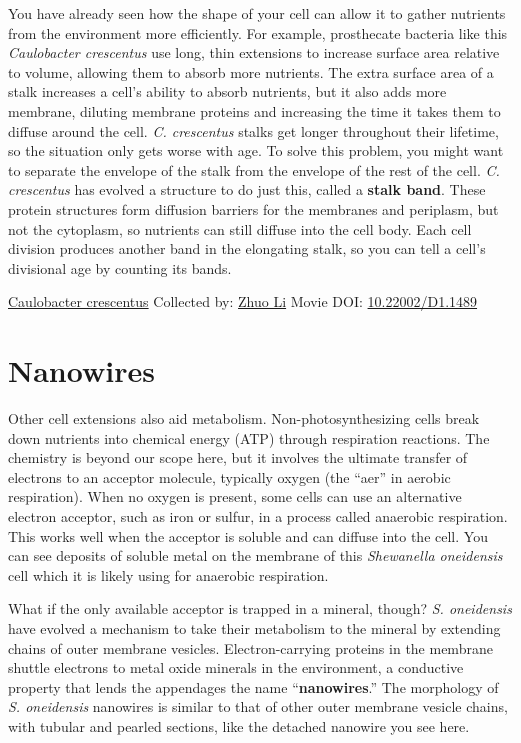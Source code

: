 \documentclass[]{tufte-book}
\begin{document}
You have already seen how the shape of your cell can allow it to gather nutrients from the environment more efficiently. For example, prosthecate bacteria like this \emph{Caulobacter crescentus} use long, thin extensions to increase surface area relative to volume, allowing them to absorb more nutrients. The extra surface area of a stalk increases a cell's ability to absorb nutrients, but it also adds more membrane, diluting membrane proteins and increasing the time it takes them to diffuse around the cell. \emph{C. crescentus} stalks get longer throughout their lifetime, so the situation only gets worse with age. To solve this problem, you might want to separate the envelope of the stalk from the envelope of the rest of the cell. \emph{C. crescentus} has evolved a structure to do just this, called a \textbf{stalk band}. These protein structures form diffusion barriers for the membranes and periplasm, but not the cytoplasm, so nutrients can still diffuse into the cell body. Each cell division produces another band in the elongating stalk, so you can tell a cell's divisional age by counting its bands.



\hypertarget{htmlwidget-daf8a1cce5c1dad69fb3}{}

\label{fig:4-1}\protect\hyperlink{tree}{Caulobacter crescentus} Collected by: \protect\hyperlink{zhuo_li}{Zhuo Li} Movie DOI: \href{https://doi.org/10.22002/D1.1489}{10.22002/D1.1489}

\hypertarget{nanowires}{%
\section{Nanowires}\label{nanowires}}

Other cell extensions also aid metabolism. Non-photosynthesizing cells break down nutrients into chemical energy (ATP) through respiration reactions. The chemistry is beyond our scope here, but it involves the ultimate transfer of electrons to an acceptor molecule, typically oxygen (the ``aer'' in aerobic respiration). When no oxygen is present, some cells can use an alternative electron acceptor, such as iron or sulfur, in a process called anaerobic respiration. This works well when the acceptor is soluble and can diffuse into the cell. You can see deposits of soluble metal on the membrane of this \emph{Shewanella oneidensis} cell which it is likely using for anaerobic respiration.

What if the only available acceptor is trapped in a mineral, though? \emph{S. oneidensis} have evolved a mechanism to take their metabolism to the mineral by extending chains of outer membrane vesicles. Electron-carrying proteins in the membrane shuttle electrons to metal oxide minerals in the environment, a conductive property that lends the appendages the name ``\textbf{nanowires}.'' The morphology of \emph{S. oneidensis} nanowires is similar to that of other outer membrane vesicle chains, with tubular and pearled sections, like the detached nanowire you see here.
\end{document}
